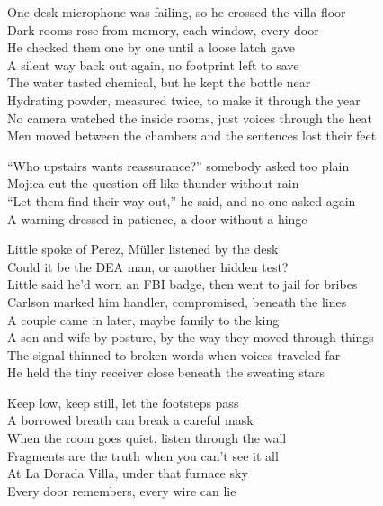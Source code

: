 \begin{lyrics}
One desk microphone was failing, so he crossed the villa floor\\
Dark rooms rose from memory, each window, every door\\
He checked them one by one until a loose latch gave\\
A silent way back out again, no footprint left to save\\
The water tasted chemical, but he kept the bottle near\\
Hydrating powder, measured twice, to make it through the year\\
No camera watched the inside rooms, just voices through the heat\\
Men moved between the chambers and the sentences lost their feet

“Who upstairs wants reassurance?” somebody asked too plain\\
Mojica cut the question off like thunder without rain\\
“Let them find their way out,” he said, and no one asked again\\
A warning dressed in patience, a door without a hinge

Little spoke of Perez, Müller listened by the desk\\
Could it be the DEA man, or another hidden test?\\
Little said he’d worn an FBI badge, then went to jail for bribes\\
Carlson marked him handler, compromised, beneath the lines\\
A couple came in later, maybe family to the king\\
A son and wife by posture, by the way they moved through things\\
The signal thinned to broken words when voices traveled far\\
He held the tiny receiver close beneath the sweating stars

Keep low, keep still, let the footsteps pass\\
A borrowed breath can break a careful mask\\
When the room goes quiet, listen through the wall\\
Fragments are the truth when you can't see it all\\
At La Dorada Villa, under that furnace sky\\
Every door remembers, every wire can lie


\end{lyrics}
